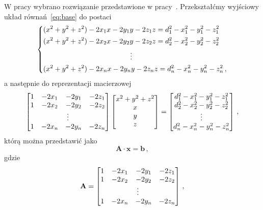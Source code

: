 W pracy wybrano rozwiązanie przedstawione w pracy~\cite{norrdine2012algebraic}. Przekształćmy wyjściowy układ równań~\ref{eq:base} do postaci
\begin{equation}
    \begin{dcases}
        (x^2 + y^2 + z^2) - 2x_1x - 2y_1y - 2z_1z = d_1^2 - x_1^2 - y_1^2 - z_1^2\\
        (x^2 + y^2 + z^2) - 2x_2x - 2y_2y - 2z_2z = d_2^2 - x_2^2 - y_2^2 - z_2^2\\
        \mspace{220mu}\vdots\\
        (x^2 + y^2 + z^2) - 2x_n x - 2y_n y - 2z_n z = d_n^2 - x_n^2 - y_n^2 - z_n^2\,,
    \end{dcases}
\end{equation}
a następnie do reprezentacji macierzowej
\begin{equation}
    \left[
        \begin{matrix}
            1 & -2x_1 & -2y_1 & -2z_1\\
            1 & -2x_2 & -2y_2 & -2z_2\\
            \multicolumn{4}{c}{\vdots}\\
            1 & -2x_n & -2y_n & -2z_n\\
        \end{matrix}
    \right]
    \left[
        \begin{matrix}
            x^2 + y^2 + z^2\\
            x\\
            y\\
            z\\
        \end{matrix}
    \right]
    =
    \left[
        \begin{matrix}
            d_1^2 - x_1^2 - y_1^2 - z_1^2\\
            d_2^2 - x_2^2 - y_2^2 - z_2^2\\
            \vdots\\
            d_n^2 - x_n^2 - y_n^2 - z_n^2\\
        \end{matrix}
    \right]\,,
\end{equation}
którą można przedstawić jako
\begin{equation}
    \mathbf{A} \cdot \mathbf{x} = \mathbf{b}\,,
\label{eq:matrix}
\end{equation}
gdzie
\begin{equation}
    \mathbf{A} =
    \left[
        \begin{matrix}
            1 & -2x_1 & -2y_1 & -2z_1\\
            1 & -2x_2 & -2y_2 & -2z_2\\
            \multicolumn{4}{c}{\vdots}\\
            1 & -2x_n & -2y_n & -2z_n\\
        \end{matrix}
    \right]\,,
\end{equation}
